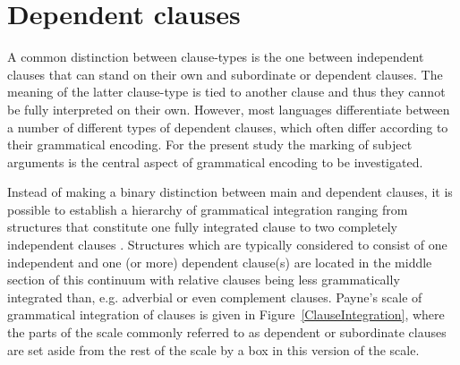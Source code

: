 \section{Dependent clauses}\label{DepCl}

A common distinction between clause-types is the one between independent clauses that can stand on their own and subordinate or dependent clauses. 
The meaning of the latter clause-type is tied to another clause and thus they cannot be fully interpreted on their own.  
However, most languages differentiate between a number of different types of dependent clauses, which often differ according to their grammatical encoding.
For the present study the marking of subject arguments is the central aspect of grammatical encoding to be investigated.

Instead of making a binary distinction between main and dependent clauses, it is possible to establish a hierarchy of grammatical integration ranging from structures that constitute one fully integrated clause to two completely independent clauses \citep[307]{Payne:1997}. 
Structures which are typically considered to consist of one independent and one (or more) dependent clause(s) are located in the middle section of this continuum with relative clauses being less grammatically integrated than, e.g. adverbial or even complement clauses. 
Payne's scale of grammatical integration of clauses is given in Figure~\ref{ClauseIntegration}, where the parts of the scale commonly referred to as dependent or subordinate clauses are set aside from the rest of the scale by a box in this version of the scale.
 

